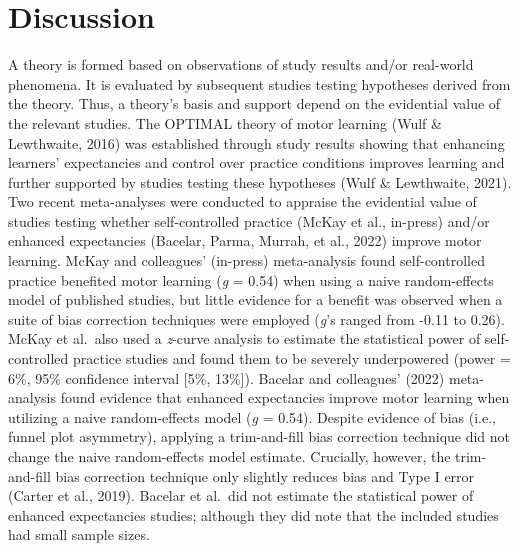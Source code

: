 \documentclass[
  doc, donotrepeattitle,floatsintext]{apa7}
\begin{document}
\clearpage

\normalsize

\hypertarget{discussion}{%
\section{Discussion}\label{discussion}}

A theory is formed based on observations of study results and/or real-world phenomena. It is evaluated by subsequent studies testing hypotheses derived from the theory. Thus, a theory's basis and support depend on the evidential value of the relevant studies. The OPTIMAL theory of motor learning (Wulf \& Lewthwaite, 2016) was established through study results showing that enhancing learners' expectancies and control over practice conditions improves learning and further supported by studies testing these hypotheses (Wulf \& Lewthwaite, 2021). Two recent meta-analyses were conducted to appraise the evidential value of studies testing whether self-controlled practice (McKay et al., in-press) and/or enhanced expectancies (Bacelar, Parma, Murrah, et al., 2022) improve motor learning. McKay and colleagues' (in-press) meta-analysis found self-controlled practice benefited motor learning (\emph{g} = 0.54) when using a naive random-effects model of published studies, but little evidence for a benefit was observed when a suite of bias correction techniques were employed (\emph{g}'s ranged from -0.11 to 0.26). McKay et al.~also used a \emph{z}-curve analysis to estimate the statistical power of self-controlled practice studies and found them to be severely underpowered (power = 6\%, 95\% confidence interval {[}5\%, 13\%{]}). Bacelar and colleagues' (2022) meta-analysis found evidence that enhanced expectancies improve motor learning when utilizing a naive random-effects model (\emph{g} = 0.54). Despite evidence of bias (i.e., funnel plot asymmetry), applying a trim-and-fill bias correction technique did not change the naive random-effects model estimate. Crucially, however, the trim-and-fill bias correction technique only slightly reduces bias and Type I error (Carter et al., 2019). Bacelar et al.~did not estimate the statistical power of enhanced expectancies studies; although they did note that the included studies had small sample sizes.
\end{document}
